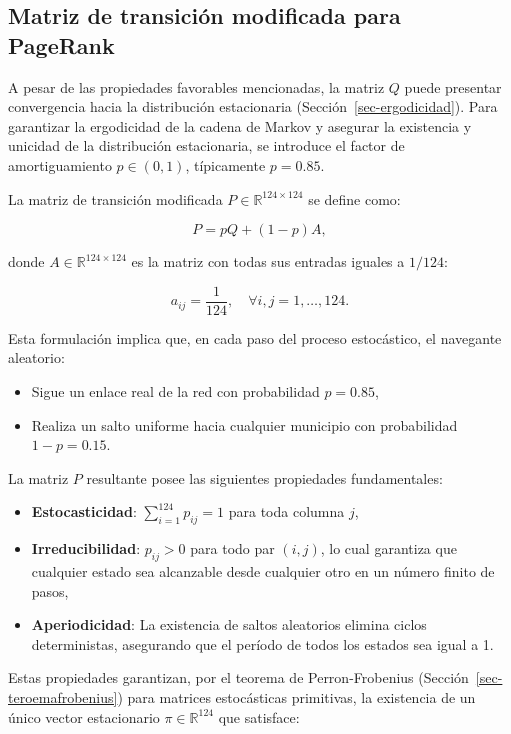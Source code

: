 \documentclass[
  spanish,
  us-letterpaper,
]{scrreprt}
\providecommand{\tightlist}{%
  \setlength{\itemsep}{0pt}\setlength{\parskip}{0pt}}
\numberwithin{equation}{section}
\begin{document}
\subsection{Matriz de transición modificada para
PageRank}\label{sec-transicion2}

A pesar de las propiedades favorables mencionadas, la matriz \(Q\) puede
presentar convergencia hacia la distribución estacionaria
(Sección~\ref{sec-ergodicidad}). Para garantizar la ergodicidad de la
cadena de Markov y asegurar la existencia y unicidad de la distribución
estacionaria, se introduce el factor de amortiguamiento \(p \in (0,1)\),
típicamente \(p = 0.85\).

La matriz de transición modificada \(P \in \mathbb{R}^{124 \times 124}\)
se define como:

\[
P = pQ + (1-p)A,
\]

donde \(A \in \mathbb{R}^{124 \times 124}\) es la matriz con todas sus
entradas iguales a \(1/124\):

\[
a_{ij} = \frac{1}{124}, \quad \forall i,j = 1,\dots,124.
\]

Esta formulación implica que, en cada paso del proceso estocástico, el
navegante aleatorio:

\begin{itemize}
\tightlist
\item
  Sigue un enlace real de la red con probabilidad \(p = 0.85\),
\item
  Realiza un salto uniforme hacia cualquier municipio con probabilidad
  \(1-p = 0.15\).
\end{itemize}

La matriz \(P\) resultante posee las siguientes propiedades
fundamentales:

\begin{itemize}
\tightlist
\item
  \textbf{Estocasticidad}: \(\sum_{i=1}^{124} p_{ij} = 1\) para toda
  columna \(j\),
\item
  \textbf{Irreducibilidad}: \(p_{ij} > 0\) para todo par \((i,j)\), lo
  cual garantiza que cualquier estado sea alcanzable desde cualquier
  otro en un número finito de pasos,
\item
  \textbf{Aperiodicidad}: La existencia de saltos aleatorios elimina
  ciclos deterministas, asegurando que el período de todos los estados
  sea igual a 1.
\end{itemize}

Estas propiedades garantizan, por el teorema de Perron-Frobenius
(Sección~\ref{sec-teroemafrobenius}) para matrices estocásticas
primitivas, la existencia de un único vector estacionario
\(\pi \in \mathbb{R}^{124}\) que satisface:
\end{document}

